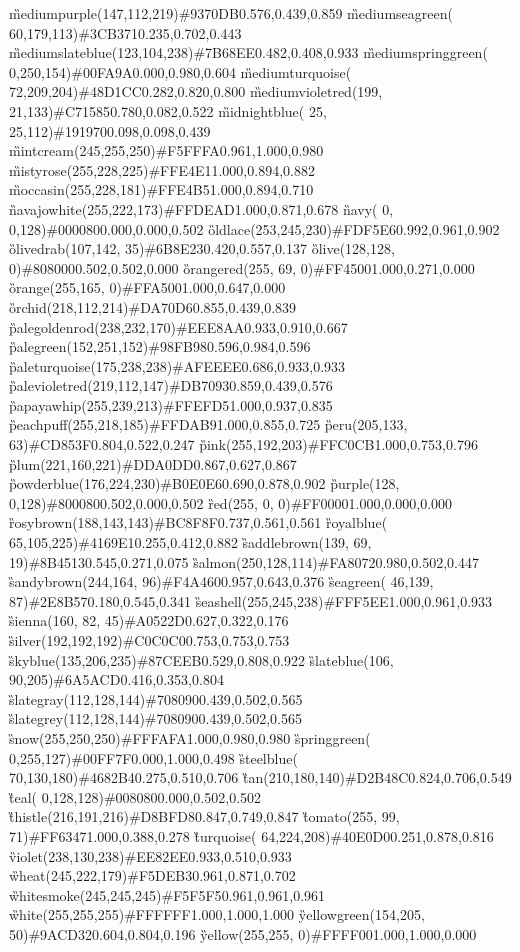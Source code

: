 \G{mediumpurple}{(147,112,219)}{\#9370DB}{0.576,0.439,0.859}
\G{mediumseagreen}{( 60,179,113)}{\#3CB371}{0.235,0.702,0.443}
\G{mediumslateblue}{(123,104,238)}{\#7B68EE}{0.482,0.408,0.933}
\G{mediumspringgreen}{(  0,250,154)}{\#00FA9A}{0.000,0.980,0.604}
\G{mediumturquoise}{( 72,209,204)}{\#48D1CC}{0.282,0.820,0.800}
\G{mediumvioletred}{(199, 21,133)}{\#C71585}{0.780,0.082,0.522}
\G{midnightblue}{( 25, 25,112)}{\#191970}{0.098,0.098,0.439}
\G{mintcream}{(245,255,250)}{\#F5FFFA}{0.961,1.000,0.980}
\G{mistyrose}{(255,228,225)}{\#FFE4E1}{1.000,0.894,0.882}
\G{moccasin}{(255,228,181)}{\#FFE4B5}{1.000,0.894,0.710}
\G{navajowhite}{(255,222,173)}{\#FFDEAD}{1.000,0.871,0.678}
\G{navy}{(  0,  0,128)}{\#000080}{0.000,0.000,0.502}
\G{oldlace}{(253,245,230)}{\#FDF5E6}{0.992,0.961,0.902}
\G{olivedrab}{(107,142, 35)}{\#6B8E23}{0.420,0.557,0.137}
\G{olive}{(128,128,  0)}{\#808000}{0.502,0.502,0.000}
\G{orangered}{(255, 69,  0)}{\#FF4500}{1.000,0.271,0.000}
\G{orange}{(255,165,  0)}{\#FFA500}{1.000,0.647,0.000}
\G{orchid}{(218,112,214)}{\#DA70D6}{0.855,0.439,0.839}
\G{palegoldenrod}{(238,232,170)}{\#EEE8AA}{0.933,0.910,0.667}
\G{palegreen}{(152,251,152)}{\#98FB98}{0.596,0.984,0.596}
\G{paleturquoise}{(175,238,238)}{\#AFEEEE}{0.686,0.933,0.933}
\G{palevioletred}{(219,112,147)}{\#DB7093}{0.859,0.439,0.576}
\G{papayawhip}{(255,239,213)}{\#FFEFD5}{1.000,0.937,0.835}
\G{peachpuff}{(255,218,185)}{\#FFDAB9}{1.000,0.855,0.725}
\G{peru}{(205,133, 63)}{\#CD853F}{0.804,0.522,0.247}
\G{pink}{(255,192,203)}{\#FFC0CB}{1.000,0.753,0.796}
\G{plum}{(221,160,221)}{\#DDA0DD}{0.867,0.627,0.867}
\G{powderblue}{(176,224,230)}{\#B0E0E6}{0.690,0.878,0.902}
\G{purple}{(128,  0,128)}{\#800080}{0.502,0.000,0.502}
\G{red}{(255,  0,  0)}{\#FF0000}{1.000,0.000,0.000}
\G{rosybrown}{(188,143,143)}{\#BC8F8F}{0.737,0.561,0.561}
\G{royalblue}{( 65,105,225)}{\#4169E1}{0.255,0.412,0.882}
\G{saddlebrown}{(139, 69, 19)}{\#8B4513}{0.545,0.271,0.075}
\G{salmon}{(250,128,114)}{\#FA8072}{0.980,0.502,0.447}
\G{sandybrown}{(244,164, 96)}{\#F4A460}{0.957,0.643,0.376}
\G{seagreen}{( 46,139, 87)}{\#2E8B57}{0.180,0.545,0.341}
\G{seashell}{(255,245,238)}{\#FFF5EE}{1.000,0.961,0.933}
\G{sienna}{(160, 82, 45)}{\#A0522D}{0.627,0.322,0.176}
\G{silver}{(192,192,192)}{\#C0C0C0}{0.753,0.753,0.753}
\G{skyblue}{(135,206,235)}{\#87CEEB}{0.529,0.808,0.922}
\G{slateblue}{(106, 90,205)}{\#6A5ACD}{0.416,0.353,0.804}
\G{slategray}{(112,128,144)}{\#708090}{0.439,0.502,0.565}
\G{slategrey}{(112,128,144)}{\#708090}{0.439,0.502,0.565}
\G{snow}{(255,250,250)}{\#FFFAFA}{1.000,0.980,0.980}
\G{springgreen}{(  0,255,127)}{\#00FF7F}{0.000,1.000,0.498}
\G{steelblue}{( 70,130,180)}{\#4682B4}{0.275,0.510,0.706}
\G{tan}{(210,180,140)}{\#D2B48C}{0.824,0.706,0.549}
\G{teal}{(  0,128,128)}{\#008080}{0.000,0.502,0.502}
\G{thistle}{(216,191,216)}{\#D8BFD8}{0.847,0.749,0.847}
\G{tomato}{(255, 99, 71)}{\#FF6347}{1.000,0.388,0.278}
\G{turquoise}{( 64,224,208)}{\#40E0D0}{0.251,0.878,0.816}
\G{violet}{(238,130,238)}{\#EE82EE}{0.933,0.510,0.933}
\G{wheat}{(245,222,179)}{\#F5DEB3}{0.961,0.871,0.702}
\G{whitesmoke}{(245,245,245)}{\#F5F5F5}{0.961,0.961,0.961}
\G{white}{(255,255,255)}{\#FFFFFF}{1.000,1.000,1.000}
\G{yellowgreen}{(154,205, 50)}{\#9ACD32}{0.604,0.804,0.196}
\G{yellow}{(255,255,  0)}{\#FFFF00}{1.000,1.000,0.000}
